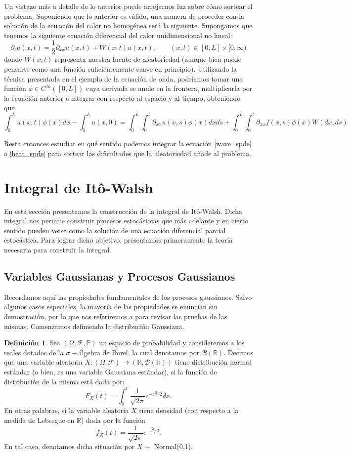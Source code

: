 \documentclass[letterpaper,twoside,12pt]{book}
\newcommand{\R}{\mathbb{R}}
\newcommand{\F}{\mathcal{F}}
\newcommand{\B}{\mathcal{B}}
\renewcommand{\P}{\mathbb{P}}
\newcommand{\1}{\mathds{1}}
\renewcommand{\to}{\rightarrow}
\theoremstyle{definition}
\newtheorem{dfn}{Definición}
\theoremstyle{definition}
\theoremstyle{definition}
\theoremstyle{definition}
\theoremstyle{definition}
\theoremstyle{definition}
\theoremstyle{definition}
\begin{document}
Un vistazo más a detalle de lo anterior puede arrojarnos luz sobre cómo sortear el problema. Suponiendo que lo anterior es válido, una manera de proceder con la solución de la ecuación del calor no homogénea será la siguiente. Supongamos que tenemos la siguiente ecuación diferencial del calor unidimensional no lineal:
\[
\partial_tu(x,t)=\frac{1}{2}\partial_{xx}u(x,t)+W(x,t)u(x,t), \qquad (x,t)\in [0,L]\times [0,\infty) 
\]
donde $W(x,t)$ representa nuestra fuente de aleatoriedad (aunque bien puede pensarse como una función suficientemente suave en principio). Utilizando la técnica presentada en el ejemplo de la ecuación de onda, podríamos tomar una función $\phi \in C^{\infty}([0,L])$ cuya derivada se anule en la frontera, multiplicarla por la ecuación anterior e integrar con respecto al espacio y al tiempo, obteniendo que 
\[
\int_{0}^{L}u(x,t)\phi(x)dx-\int_{0}^{L}u(x,0)=\int_{0}^{L}\int_{0}^{t}\partial_{xx}u(x,s)\phi(x)dx ds+\int_{0}^{L}\int_{0}^{t}\partial_{xx}f(x,s)\phi(x)W(dx,ds)
\]
 
Resta entonces estudiar en qué sentido podemos integrar la ecuación \eqref{wave_spde} o \eqref{heat_spde} para sortear las dificultades que la aleatoriedad añade al problema.


\section{Integral de Itô-Walsh}
En esta sección presentamos la construcción de la integral de Itô-Walsh. Dicha integral nos permite construir procesos estocásticas que más adelante y en cierto sentido pueden verse como la solución de una ecuación diferencial parcial estocástica. Para lograr dicho objetivo, presentamos primeramente la teoría necesaria para construir la integral.
\subsection{Variables Gaussianas y Procesos Gaussianos}
Recordamos aquí las propiedades fundamentales de los procesos gaussianos. Salvo algunos casos especiales, la mayoría de las propiedades se enuncian sin demostración, por lo que nos referiremos a \cite{LeGall2016} para revisar las pruebas de las mismas. Comenzamos definiendo la distribución Gaussiana.

\begin{dfn}
Sea $(\Omega, \F, \P)$ un espacio de probabilidad y consideremos a los reales dotados de la $\sigma-$álgebra de Borel, la cual denotamos por $\B(\R)$. Decimos que una variable aleatoria $X:(\Omega, \F)\to (\R,\B(\R))$ tiene distribución normal estándar (o bien, es una variable Gaussiana estándar), si la función de distribución de la misma está dada por: 
\[
F_X(t)=\int_{0}^{t}\frac{1}{\sqrt{2\pi}}e^{-x^2/2}dx.    
\]
En otras palabras, si la variable aleatoria $X$ tiene densidad (con respecto a la medida de Lebesgue en $\R$) dada por la función 
\[
f_X(t)=\frac{1}{\sqrt{2\pi}}e^{-t^2/2}.
\]
En tal caso, denotamos dicha situación por $X\sim$ Normal(0,1).
\end{dfn}
\end{document}
